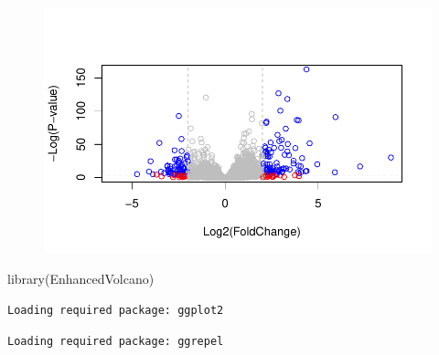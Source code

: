 \documentclass[
  letterpaper,
  DIV=11,
  numbers=noendperiod]{scrartcl}
\newenvironment{Shaded}{\begin{snugshade}}{\end{snugshade}}
\newcommand{\AttributeTok}[1]{\textcolor[rgb]{0.40,0.45,0.13}{#1}}
\newcommand{\FunctionTok}[1]{\textcolor[rgb]{0.28,0.35,0.67}{#1}}
\newcommand{\NormalTok}[1]{\textcolor[rgb]{0.00,0.23,0.31}{#1}}
\newcommand{\OtherTok}[1]{\textcolor[rgb]{0.00,0.23,0.31}{#1}}
\newcommand{\SpecialCharTok}[1]{\textcolor[rgb]{0.37,0.37,0.37}{#1}}
\newcommand{\StringTok}[1]{\textcolor[rgb]{0.13,0.47,0.30}{#1}}
\begin{document}
\begin{figure}[H]

{\centering \includegraphics{12writeup_files/figure-pdf/unnamed-chunk-31-1.pdf}

}

\end{figure}

\begin{Shaded}
\begin{Highlighting}[]
\FunctionTok{library}\NormalTok{(EnhancedVolcano)}
\end{Highlighting}
\end{Shaded}

\begin{verbatim}
Loading required package: ggplot2
\end{verbatim}

\begin{verbatim}
Loading required package: ggrepel
\end{verbatim}

\begin{Shaded}
\end{Shaded}
\end{document}
